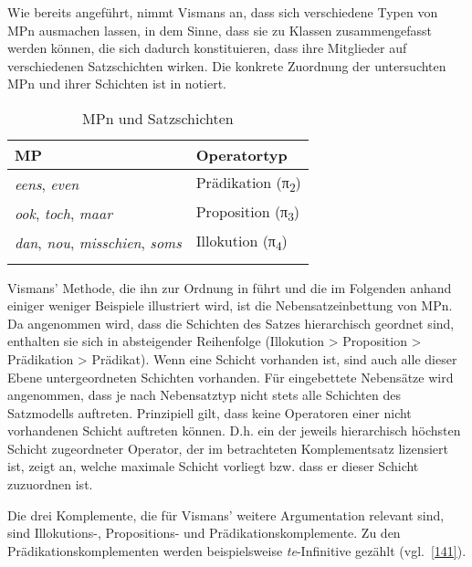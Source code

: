 Wie bereits angeführt, nimmt Vismans an, dass sich verschiedene Typen von MPn ausmachen lassen, in dem Sinne, dass sie zu Klassen zusammengefasst werden können, die sich dadurch konstituieren, dass ihre Mitglieder auf verschiedenen Satzschichten wirken. Die konkrete Zuordnung der untersuchten MPn und ihrer Schichten ist in  notiert.

\begin{table}
	\caption{\label{tab:140}MPn und Satzschichten}
	\begin{tabular}[t]{ll}
	\lsptoprule
  	MP & Operatortyp\\
  	\midrule
  	\textit{eens}, \textit{even} & Prädikation (π\textsubscript{2})\\
  	 	\textit{ook}, \textit{toch}, \textit{maar} & Proposition (π\textsubscript{3})\\
  		\textit{dan}, \textit{nou}, \textit{misschien}, \textit{soms} & Illokution (π\textsubscript{4})\\  	
	\lspbottomrule
	\end{tabular}
\end{table}
\noindent Vismans' Methode, die ihn zur Ordnung in  führt und die im Folgenden anhand einiger weniger Beispiele illustriert wird, ist die Nebensatzeinbettung von MPn. Da angenommen wird, dass die Schichten des Satzes hierarchisch geordnet sind, enthalten sie sich in absteigender Reihenfolge (Illokution > Proposition > Prädikation > Prädikat). Wenn eine Schicht vorhanden ist, sind auch alle dieser Ebene untergeordneten Schichten vorhanden. Für eingebettete Nebensätze wird angenommen, dass je nach Nebensatztyp nicht stets alle Schichten des Satzmo\-dells auftreten. Prinzipiell gilt, dass keine Operatoren einer nicht vorhandenen Schicht auftreten können. D.h. ein der jeweils hierarchisch höchsten Schicht zugeordneter Operator, der im betrachteten Komplementsatz lizensiert ist, zeigt an, welche maximale Schicht vorliegt bzw. dass er dieser Schicht zuzuordnen ist. 

Die drei Komplemente, die für Vismans' weitere Argumentation relevant sind, sind Illokutions-, Propositions- und Prädikationskomplemente. Zu den Prädikationskomplementen  werden  beispielsweise \textit{te}-Infinitive  gezählt (vgl.\ \ref{141}).

